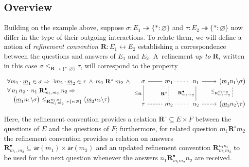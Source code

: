 \documentclass[acmsmall,screen,review,anonymous,nonacm]{acmart}
\newcommand{\kw}[1]{\ensuremath{ \mathsf{#1} }}
\begin{document}
\subsection{Overview}

Building on the example above, suppose
$\sigma : E_1 \twoheadrightarrow \{* : \varnothing\}$ and
$\tau : E_2 \twoheadrightarrow \{* : \varnothing\}$
now differ in the type of their outgoing interactions.
To relate them,
we will define a notion of \emph{refinement convention}
$\mathbf{R} : E_1 \leftrightarrow E_2$
establishing a correspondence between
the questions and answers of $E_1$ and $E_2$.
A~refinement \emph{up to} $\mathbf{R}$,
written in this case
$\sigma \le_{\mathbf{R} \twoheadrightarrow \{*:\varnothing\}} \tau$,
will correspond to the property
\begin{equation} \label{eqn:simupto}
  \begin{array}{l}
  \forall m_1 \cdot \underline{m}_1 \in \sigma \Rightarrow {}
  \exists m_2 \cdot \underline{m}_2 \in \tau \:\wedge\:
    m_1 \mathrel{\mathbf{R}^\circ} m_2 \:\wedge\: {}
  \\[0.66ex]
  \forall \, n_1 \, n_2 \cdot \:
    n_1 \mathrel{\mathbf{R}^\bullet_{m_1,m_2}} n_2 \Rightarrow
  \\[0.66ex] \quad
    \bigl(\underline{m}_1 n_1 \backslash \sigma \bigr)
    \le_{\mathbf{R}_{m_1,m_2}^{n_1,n_2} \twoheadrightarrow \{*:\varnothing\}}
    \bigl(\underline{m}_2 n_2 \backslash \tau \bigr)
  \end{array}
  \hspace{-1ex} %
  \begin{tikzcd}
    \sigma \ar[r,dash] \ar[d, dash, "\le_\mathbf{R}"'] &
    m_1 \ar[r,dotted,dash] \ar[d,dash,dashed,"\mathbf{R}^\circ"'] &
    n_1 \ar[r] \ar[d,dash, "\mathbf{R}^\bullet_{m_1m_2}"'] &
    \bigl(\underline{m}_1 n_1 \backslash \sigma \bigr)
    \ar[d, dash, dashed, "\le_{\mathbf{R}_{m_1m_2}^{n_1n_2}}"']
    \\
    \tau \ar[r,dashed,dash] &
    m_2 \ar[r,dotted,dash] &
    n_2 \ar[r,dashed] &
    \bigl(\underline{m}_2 n_2 \backslash \tau \bigr)
  \end{tikzcd}
\end{equation}
Here,
the refinement convention provides a relation
$\mathbf{R}^\circ \subseteq E \times F$
between the questions of $E$ and the questions of $F$;
furthermore, for related question $m_1 \mathrel{\mathbf{R}^\circ} m_2$
the refinement convention provides a relation on answers
$\mathbf{R}^\bullet_{m_1,m_2} \subseteq \kw{ar}(m_1) \times \kw{ar}(m_2)$
and an updated refinement convention
$\mathbf{R}_{m_1m_2}^{n_1n_2}$ to be used for the next question
whenever the answers $n_1 \mathrel{\mathbf{R}^\bullet_{m_1m_2}} n_2$
are received.
\end{document}
